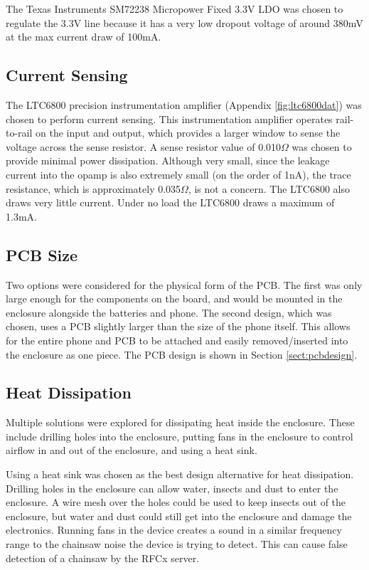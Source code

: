 \documentclass{article}
\numberwithin{figure}{section}
\numberwithin{equation}{section}
\begin{document}
{\bigskip
The Texas Instruments SM72238 Micropower Fixed 3.3V LDO was chosen to regulate the 3.3V line because it has a very low dropout voltage of around 380mV at the max current draw of 100mA.

\subsection{Current Sensing} \label{sect:cur_just}
The LTC6800 precision instrumentation amplifier (Appendix \ref{fig:ltc6800dat}) was chosen to perform current sensing. This instrumentation amplifier operates rail-to-rail on the input and output, which provides a larger window to sense the voltage across the sense resistor. A sense resistor value of 0.010$\Omega$ was chosen to provide minimal power dissipation. Although very small, since the leakage current into the opamp is also extremely small (on the order of 1nA), the trace resistance, which is approximately 0.035$\Omega$, is not a concern. The LTC6800 also draws very little current. Under no load the LTC6800 draws a maximum of 1.3mA.

\subsection{PCB Size} \label{sect:pcb_just}
Two options were considered for the physical form of the PCB. The first was only large enough for the components on the board, and would be mounted in the enclosure alongside the batteries and phone. The second design, which was chosen, uses a PCB slightly larger than the size of the phone itself. This allows for the entire phone and PCB to be attached and easily removed/inserted into the enclosure as one piece. The PCB design is shown in Section \ref{sect:pcbdesign}.

\subsection{Heat Dissipation} \label{sect:heat_just}
Multiple solutions were explored for dissipating heat inside the enclosure. These include drilling holes into the enclosure, putting fans in the enclosure to control airflow in and out of the enclosure, and using a heat sink.

\bigskip
Using a heat sink was chosen as the best design alternative for heat dissipation. Drilling holes in the enclosure can allow water, insects and dust to enter the enclosure. A wire mesh over the holes could be used to keep insects out of the enclosure, but water and dust could still get into the enclosure and damage the electronics. Running fans in the device creates a sound in a similar frequency range to the chainsaw noise the device is trying to detect. This can cause false detection of a chainsaw by the RFCx server.

}
\end{document}
